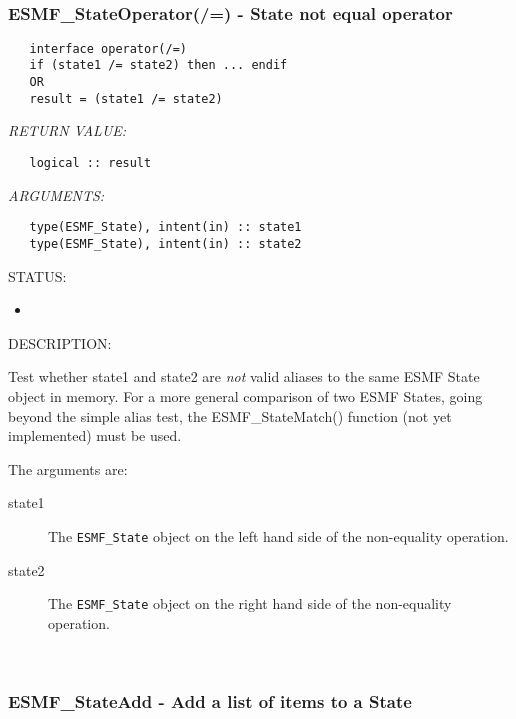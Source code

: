  
\mbox{}\hrulefill\ 
 
\subsubsection [ESMF\_StateOperator(/=)] {ESMF\_StateOperator(/=) - State not equal operator}


  
\begin{verbatim}   interface operator(/=)
   if (state1 /= state2) then ... endif
   OR
   result = (state1 /= state2)\end{verbatim}{\em RETURN VALUE:}
\begin{verbatim}   logical :: result\end{verbatim}{\em ARGUMENTS:}
\begin{verbatim}   type(ESMF_State), intent(in) :: state1
   type(ESMF_State), intent(in) :: state2\end{verbatim}
{\sf STATUS:}
   \begin{itemize}
   \item{}
   \end{itemize}
  
{\sf DESCRIPTION:\\ }


   Test whether state1 and state2 are {\it not} valid aliases to the
   same ESMF State object in memory. For a more general comparison of two ESMF
   States, going beyond the simple alias test, the ESMF\_StateMatch() function
   (not yet implemented) must be used.
  
   The arguments are:
   \begin{description}
   \item[state1]
   The {\tt ESMF\_State} object on the left hand side of the non-equality
   operation.
   \item[state2]
   The {\tt ESMF\_State} object on the right hand side of the non-equality
   operation.
   \end{description}
   
 
\mbox{}\hrulefill\ 
 
\subsubsection [ESMF\_StateAdd] {ESMF\_StateAdd - Add a list of items to a State}


